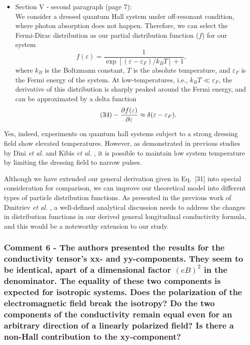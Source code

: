 \documentclass{article}
\begin{document}
\begin{itemize}
  \item Section V - second paragraph (page 7):\\
  {\color{Red}
  We consider a dressed quantum Hall system under off-resonant condition, where photon absorption does not happen. Therefore, we can select the Fermi-Dirac distribution as our partial distribution function ($f$) for our system
  \begin{equation} \tag{33}
    f(\varepsilon) = \frac{1}{\exp[(\varepsilon - \varepsilon_F)/k_B T]+1},
  \end{equation}
  where $k_B$ is the Boltzmann constant, $T$ is the absolute temperature, and $\varepsilon_F$ is the Fermi energy of the system. At low-temperatures, i.e., $k_BT \ll \varepsilon_F$, the derivative of this distribution is sharply peaked around the Fermi energy, and can be approximated by a delta function \cite{endo09}
  \begin{equation} \tag{34}
    - \pdv{f(\varepsilon)}{\varepsilon} \approx \delta(\varepsilon - \varepsilon_F).
  \end{equation}
  }
\end{itemize}

Yes, indeed, experiments on quantum hall systems subject to a strong dressing field show elevated temperatures. However, as demonstrated in previous studies by Dini \textit{et al.} \cite{dini16} and Kibis \textit{et al.} \cite{kibis15}, it is possible to maintain low system temperature by limiting the dressing field to narrow pulses.

Although we have extended our general derivation given in Eq.~[31] into special consideration for comparison, we can improve our theoretical model into different types of particle distribution functions. As presented in the previous work of Dmitriev \textit{et al.} \cite{dmitriev05}, a well-defined analytical discussion needs to address the changes in distribution functions in our derived general longitudinal conductivity formula, and this would be a noteworthy extension to our study.

\subsubsection*{Comment 6 -
\color{RoyalBlue} The authors presented the results for the conductivity tensor's xx- and yy-components. They seem to be identical, apart of a dimensional factor $(eB)^2$ in the denominator. The equality of these two components is expected for isotropic systems. Does the polarization of the electromagnetic field break the isotropy? Do the two components of the conductivity remain equal even for an arbitrary direction of a linearly polarized field? Is there a non-Hall contribution to the xy-component?
}
\end{document}

